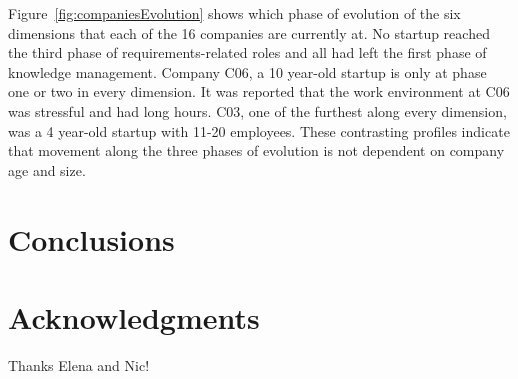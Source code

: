 \documentclass{sig-alternate}
\begin{document}
Figure~\ref{fig:companiesEvolution} shows which phase of evolution of the six dimensions that each of the 16 companies are currently at. No startup reached the third phase of requirements-related roles and all had left the first phase of knowledge management. Company C06, a 10 year-old startup is only at phase one or two in every dimension.  It was reported that the work environment at C06 was stressful and had long hours. C03, one of the furthest along every dimension, was a 4 year-old startup with 11-20 employees. These contrasting profiles indicate that movement along the three phases of evolution is not dependent on company age and size. 



\section{Conclusions}
\label{sec:conclusions}

\section*{Acknowledgments}
\label{sec:acknowledgments}

Thanks Elena and Nic!


  
\end{document}
